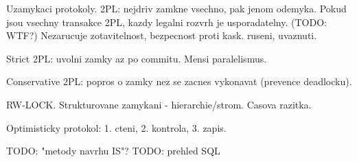 Uzamykaci protokoly.
2PL: nejdriv zamkne vsechno, pak jenom odemyka. Pokud jsou vsechny transakce
2PL, kazdy legalni rozvrh je usporadatelny. (TODO: WTF?)
Nezarucuje zotavitelnost, bezpecnost proti kask. ruseni, uvaznuti.

Strict 2PL: uvolni zamky az po commitu. Mensi paralelismus.

Conservative 2PL: popros o zamky nez se zacnes vykonavat (prevence deadlocku).

RW-LOCK.
Strukturovane zamykani - hierarchie/strom.
Casova razitka.

Optimisticky protokol: 1. cteni, 2. kontrola, 3. zapis.

TODO: "metody navrhu IS"?
TODO: prehled SQL
